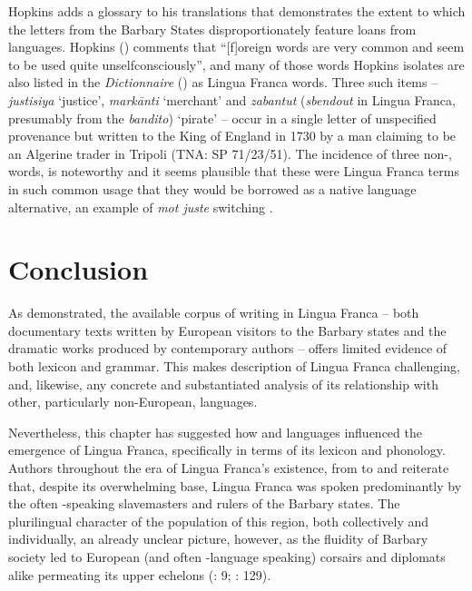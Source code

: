 \documentclass[output=paper]{langsci/langscibook}
\begin{document}
	Hopkins adds a glossary to his translations that demonstrates the extent to which the  letters from the Barbary States disproportionately feature loans from  languages. Hopkins (\citeyear[x]{Hopkins1982}) comments that “[f]oreign words are very common and seem to be used quite unselfconsciously”, and many of those words Hopkins isolates are also listed in the \textit{Dictionnaire} (\citeyear{Anonymous1830}) as Lingua Franca words. Three such items -- \textit{justisiya} ‘justice’, \textit{markānti} ‘merchant’ and \textit{zabantut} (\textit{sbendout} in Lingua Franca, presumably from the  \textit{bandito}) ‘pirate’ -- occur in a single letter of unspecified provenance but written to the King of England in 1730 by a man claiming to be an Algerine trader in Tripoli (TNA: SP 71/23/51). The incidence of three non-,  words, is noteworthy and it seems plausible that these were Lingua Franca terms in such common usage that they would be borrowed as a native language alternative, an example of \textit{mot juste} switching \citep[32]{Gardner-Chloros2009}.
	
\section{Conclusion}
	
	As demonstrated, the available corpus of writing in Lingua Franca – both documentary texts written by European visitors to the Barbary states and the dramatic works produced by contemporary authors – offers limited evidence of both lexicon and grammar. This makes description of Lingua Franca challenging, and, likewise, any concrete and substantiated analysis of its relationship with other, particularly non-European, languages.
	
	Nevertheless, this chapter has suggested how  and  languages influenced the emergence of Lingua Franca, specifically in terms of its lexicon and phonology. Authors throughout the era of Lingua Franca’s existence, from \citet{Haedo1612} to \citet{Broughton1839} and \citet{Frank1850} reiterate that, despite its overwhelming  base, Lingua Franca was spoken predominantly by the often -speaking slavemasters and rulers of the Barbary states. The plurilingual character of the population of this region, both collectively and individually,  an already unclear picture, however, as the fluidity of Barbary society led to European (and often -language speaking) corsairs and diplomats alike permeating its upper echelons (\citealt{Haedo1612}: 9; \citealt{Garcès2011}: 129).
	
\end{document}
